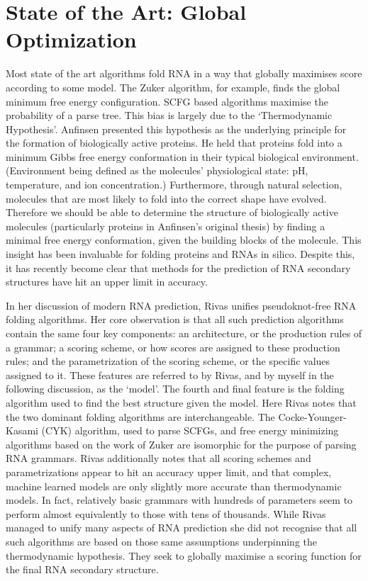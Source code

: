 \documentclass{cshonours}
\begin{document}
\section{State of the Art: Global Optimization}
\label{sec:softa}
Most state of the art algorithms fold RNA in a way that globally maximises score according to some model. The Zuker algorithm, for example, finds the global minimum free energy configuration. SCFG based algorithms maximise the probability of a parse tree. This bias is largely due to the `Thermodynamic Hypothesis'. Anfinsen \cite{anfinsen1973principles} presented this hypothesis as the underlying principle for the formation of biologically active proteins. He held that proteins fold into a minimum Gibbs free energy conformation in their typical biological environment. (Environment being defined as the molecules' physiological state: pH, temperature, and ion concentration.) Furthermore, through natural selection, molecules that are most likely to fold into the correct shape have evolved. Therefore we should be able to determine the structure of biologically active molecules (particularly proteins in Anfinsen's original thesis) by finding a minimal free energy conformation, given the building blocks of the molecule. This insight has been invaluable for folding proteins and RNAs in silico. Despite this, it has recently become clear that methods for the prediction of RNA secondary structures have hit an upper limit in accuracy.

In her discussion of modern RNA prediction, Rivas \cite{rivas2013four} unifies pseudoknot-free RNA folding algorithms. Her core observation is that all such prediction algorithms contain the same four key components: an architecture, or the production rules of a grammar; a scoring scheme, or how scores are assigned to these production rules; and the parametrization of the scoring scheme, or the specific values assigned to it. These features are referred to by Rivas, and by myself in the following discussion, as the `model'. The fourth and final feature is the folding algorithm used to find the best structure given the model. Here Rivas notes that the two dominant folding algorithms are interchangeable. The Cocke-Younger-Kasami (CYK) algorithm, used to parse SCFGs, and free energy minimizing algorithms based on the work of Zuker are isomorphic for the purpose of parsing RNA grammars. Rivas additionally notes that all scoring schemes and parametrizations appear to hit an accuracy upper limit, and that complex, machine learned models are only slightly more accurate than thermodynamic models. In fact, relatively basic grammars with hundreds of parameters seem to perform almost equivalently to those with tens of thousands. While Rivas managed to unify many aspects of RNA prediction she did not recognise that all such algorithms are based on those same assumptions underpinning the thermodynamic hypothesis. They seek to globally maximise a scoring function for the final RNA secondary structure. 
\end{document}

